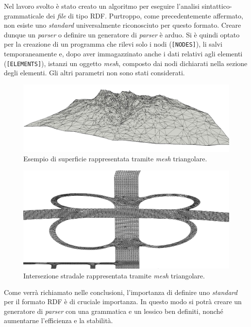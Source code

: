 Nel lavoro svolto è stato creato un algoritmo per eseguire l'analisi sintattico-grammaticale dei \textit{file} di tipo \ac{RDF}. Purtroppo, come precedentemente affermato, non esiste uno \textit{standard} universalmente riconosciuto per questo formato. Creare dunque un \textit{parser} o definire un generatore di \textit{parser} è arduo. Si è quindi optato per la creazione di un programma che rilevi solo i nodi (\texttt{[NODES]}), li salvi temporaneamente e, dopo aver immagazzinato anche i dati relativi agli elementi (\texttt{[ELEMENTS]}), istanzi un oggetto \textit{mesh}, composto dai nodi dichiarati nella sezione degli elementi. Gli altri parametri non sono stati considerati.

\begin{figure}
	\centering
	\includegraphics[width=0.7\linewidth]{Figures/mesh}
	\caption{Esempio di superficie rappresentata tramite \textit{mesh} triangolare.}
\end{figure}
\begin{figure}
	\centering
	\includegraphics[width=0.7\linewidth]{Figures/mesh_1}
	\caption{Intersezione stradale rappresentata tramite \textit{mesh} triangolare.}
\end{figure}

Come verrà richiamato nelle conclusioni, l'importanza di definire uno \textit{standard} per il formato \ac{RDF} è di cruciale importanza. In questo modo si potrà creare un generatore di \textit{parser} con una grammatica e un lessico ben definiti, nonché aumentarne l'efficienza e la stabilità.